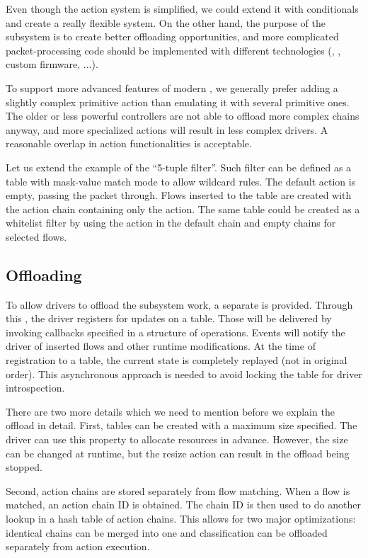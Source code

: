 Even though the action system is simplified, we could extend it with
conditionals and create a really flexible system. On the other hand, the
purpose of the subsystem is to create better offloading opportunities, and more
complicated packet-processing code should be implemented with different
technologies (, , custom firmware, ...).

To support more advanced features of modern , we generally prefer adding
a slightly complex primitive action than emulating it with several primitive ones.
The older or less powerful controllers are not able to offload more complex chains
anyway, and more specialized actions will result in less complex drivers.
A reasonable overlap in action functionalities is acceptable.

Let us extend the example of the ``5-tuple filter''. Such filter can be defined
as a table with mask-value match mode to allow wildcard rules. The default
action is empty, passing the packet through. Flows inserted to the table
are created with the action chain containing only the  action.
The same table could be created as a whitelist filter by using the 
action in the default chain and empty chains for selected flows.

\subsection{Offloading}

To allow  drivers to offload the subsystem work, a separate  is
provided. Through this , the driver registers for updates on a table.
Those will be delivered by invoking callbacks specified in a structure of
operations. Events will notify the driver of inserted flows and other
runtime modifications. At the time of registration to a table, the current
state is completely replayed (not in original order). This asynchronous
approach is needed to avoid locking the table for driver introspection.

There are two more details which we need to mention before we explain the
offload in detail. First, tables can be created with a maximum size specified. The
driver can use this property to allocate resources in advance. However, the
size can be changed at runtime, but the resize action can result in the offload
being stopped.

Second, action chains are stored separately from flow matching. When
a flow is matched, an action chain ID is obtained. The chain ID is then used to
do another lookup in a hash table of action chains. This allows for two major
optimizations: identical chains can be merged into one and classification can
be offloaded separately from action execution.

